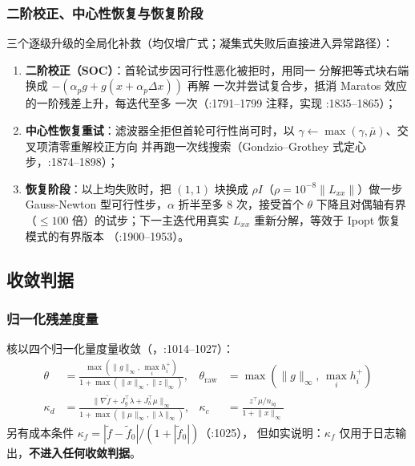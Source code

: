 \subsubsection*{二阶校正、中心性恢复与恢复阶段}
三个逐级升级的全局化补救（均仅增广式；凝集式失败后直接进入异常路径）：
\begin{enumerate}
  \item \textbf{二阶校正（SOC）}：首轮试步因可行性恶化被拒时，用同一
        分解把等式块右端换成 $-(\alpha_p g+g(x+\alpha_p\Delta x))$ 再解
        一次并尝试复合步，抵消 Maratos 效应的一阶残差上升，每迭代至多
        一次（:1791--1799 注释，实现 :1835--1865）；
  \item \textbf{中心性恢复重试}：滤波器全拒但首轮可行性尚可时，以
        $\gamma\leftarrow\max(\gamma,\bar\mu)$、交叉项清零重解校正方向
        并再跑一次线搜索（Gondzio--Grothey 式定心步，:1874--1898）；
  \item \textbf{恢复阶段}：以上均失败时，把 $(1,1)$ 块换成
        $\rho I$（$\rho=10^{-8}\lVert L_{xx}\rVert$）做一步 Gauss-Newton
        型可行性步，$\alpha$ 折半至多 8 次，接受首个
        $\theta$ 下降且对偶轴有界（$\le100$ 倍）的试步；下一主迭代用真实
        $L_{xx}$ 重新分解，等效于 Ipopt 恢复模式的有界版本
        （:1900--1953）。
\end{enumerate}

\subsection{收敛判据}\label{subsec:pipm-conv}

\subsubsection*{归一化残差度量}
核以四个归一化量度量收敛（，:1014--1027）：
\begin{align*}
\theta &= \frac{\max(\lVert g\rVert_\infty,\,\max_i h_i^{+})}
               {1+\max(\lVert x\rVert_\infty,\lVert z\rVert_\infty)},
&
\theta_{\mathrm{raw}} &= \max(\lVert g\rVert_\infty,\,\max_i h_i^{+})\\
\kappa_d &= \frac{\lVert \nabla\tilde f+J_g^{\top}\lambda
            +J_h^{\top}\mu\rVert_\infty}
            {1+\max(\lVert\mu\rVert_\infty,\lVert\lambda\rVert_\infty)},
&
\kappa_c &= \frac{z^{\top}\mu/n_{iq}}{1+\lVert x\rVert_\infty}
\end{align*}
另有成本条件 $\kappa_f=|\tilde f-\tilde f_0|/(1+|\tilde f_0|)$（:1025），
但如实说明：$\kappa_f$ 仅用于日志输出，\textbf{不进入任何收敛判据}。

